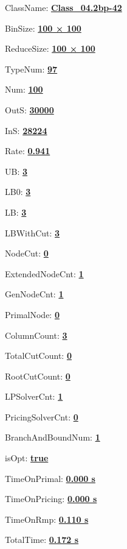 \documentclass[11pt]{article}
\begin{document}
\pagestyle{empty}


ClassName: \underline{\textbf{Class_04.2bp-42}}
\par
BinSize: \underline{\textbf{100 × 100}}
\par
ReduceSize: \underline{\textbf{100 × 100}}
\par
TypeNum: \underline{\textbf{97}}
\par
Num: \underline{\textbf{100}}
\par
OutS: \underline{\textbf{30000}}
\par
InS: \underline{\textbf{28224}}
\par
Rate: \underline{\textbf{0.941}}
\par
UB: \underline{\textbf{3}}
\par
LB0: \underline{\textbf{3}}
\par
LB: \underline{\textbf{3}}
\par
LBWithCut: \underline{\textbf{3}}
\par
NodeCut: \underline{\textbf{0}}
\par
ExtendedNodeCnt: \underline{\textbf{1}}
\par
GenNodeCnt: \underline{\textbf{1}}
\par
PrimalNode: \underline{\textbf{0}}
\par
ColumnCount: \underline{\textbf{3}}
\par
TotalCutCount: \underline{\textbf{0}}
\par
RootCutCount: \underline{\textbf{0}}
\par
LPSolverCnt: \underline{\textbf{1}}
\par
PricingSolverCnt: \underline{\textbf{0}}
\par
BranchAndBoundNum: \underline{\textbf{1}}
\par
isOpt: \underline{\textbf{true}}
\par
TimeOnPrimal: \underline{\textbf{0.000 s}}
\par
TimeOnPricing: \underline{\textbf{0.000 s}}
\par
TimeOnRmp: \underline{\textbf{0.110 s}}
\par
TotalTime: \underline{\textbf{0.172 s}}
\par
\newpage
\end{document}
